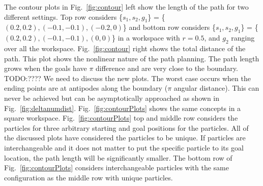  The contour plots in Fig.~\ref{fig:contour} left show the length of the path for two different settings. Top row considers \{$s_1,s_2,g_1$\} = \{$(0.2,0.2),(-0.1,-0.1),(-0.2,0)$\} and bottom row considers  \{$s_1,s_2,g_1$\} = \{$(0.2,0.2),(-0.1,-0.1),(0,0)$\} in a workspace with $r= 0.5$, and $g_2$ ranging over all the workspace. Fig.~\ref{fig:contour} right shows the total distance of the path. This plot shows the nonlinear nature of the path planning. The path length grows when the goals have $\pi$ difference and are very close to the boundary. TODO:???? We need to discuss the new plots.
 The worst case occurs when the ending points are at antipodes along the boundary ($\pi$ angular distance). This can never be achieved but can be asymptotically approached as shown in Fig.~\ref{fig:deltanumdist}. 
 Fig.~\ref{fig:contourPlots} shows the same concepts in a square workspace. Fig.~\ref{fig:contourPlots} top and middle row considers the particles for three arbitrary starting and goal positions for the particles. All of the discussed plots have considered the particles to be unique. If particles are interchangeable and it does not matter to put the specific particle to its goal location, the path length will be significantly smaller. The bottom row of  Fig.~\ref{fig:contourPlots} considers interchangeable particles with the same configuration as the middle row with unique particles.
 
 










